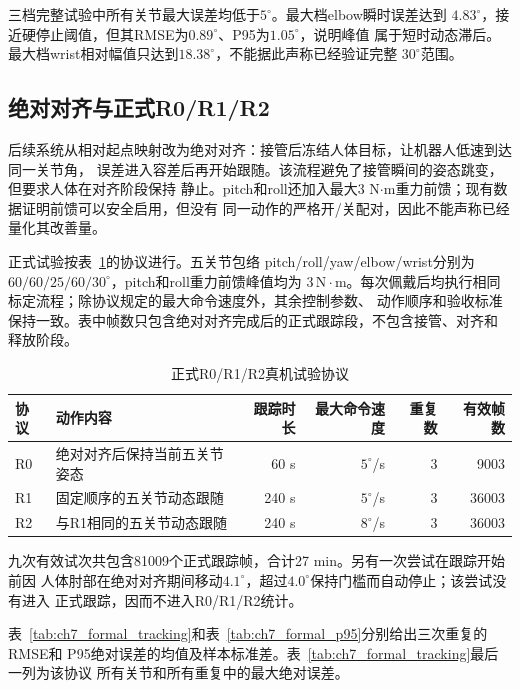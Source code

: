 三档完整试验中所有关节最大误差均低于$5^\circ$。最大档elbow瞬时误差达到
$4.83^\circ$，接近硬停止阈值，但其RMSE为$0.89^\circ$、P95为$1.05^\circ$，说明峰值
属于短时动态滞后。最大档wrist相对幅值只达到$18.38^\circ$，不能据此声称已经验证完整
$30^\circ$范围。

\subsection{绝对对齐与正式R0/R1/R2}
\label{subsec:ch7_absolute_formal_trials}

后续系统从相对起点映射改为绝对对齐：接管后冻结人体目标，让机器人低速到达同一关节角，
误差进入容差后再开始跟随。该流程避免了接管瞬间的姿态跳变，但要求人体在对齐阶段保持
静止。pitch和roll还加入最大3 N$\cdot$m重力前馈；现有数据证明前馈可以安全启用，但没有
同一动作的严格开/关配对，因此不能声称已经量化其改善量。

正式试验按表~\ref{tab:ch7_formal_protocols}的协议进行。五关节包络
pitch/roll/yaw/elbow/wrist分别为$60/60/25/60/30^\circ$，pitch和roll重力前馈峰值均为
$3\,\mathrm{N\!\cdot\!m}$。每次佩戴后均执行相同标定流程；除协议规定的最大命令速度外，其余控制参数、
动作顺序和验收标准保持一致。表中帧数只包含绝对对齐完成后的正式跟踪段，不包含接管、对齐和
释放阶段。

\begin{table}[htbp]
  \centering
  \caption{正式R0/R1/R2真机试验协议}
  \label{tab:ch7_formal_protocols}
  \begin{tabularx}{\linewidth}{@{}lXrrrr@{}}
    \toprule
    协议 & 动作内容 & 跟踪时长 & 最大命令速度 & 重复数 & 有效帧数 \\
    \midrule
    R0 & 绝对对齐后保持当前五关节姿态 & 60 s & $5^\circ$/s & 3 & 9003 \\
    R1 & 固定顺序的五关节动态跟随 & 240 s & $5^\circ$/s & 3 & 36003 \\
    R2 & 与R1相同的五关节动态跟随 & 240 s & $8^\circ$/s & 3 & 36003 \\
    \bottomrule
  \end{tabularx}
\end{table}

九次有效试次共包含81009个正式跟踪帧，合计27 min。另有一次尝试在跟踪开始前因
人体肘部在绝对对齐期间移动$4.1^\circ$，超过$4.0^\circ$保持门槛而自动停止；该尝试没有进入
正式跟踪，因而不进入R0/R1/R2统计。

表~\ref{tab:ch7_formal_tracking}和表~\ref{tab:ch7_formal_p95}分别给出三次重复的RMSE和
P95绝对误差的均值及样本标准差。表~\ref{tab:ch7_formal_tracking}最后一列为该协议
所有关节和所有重复中的最大绝对误差。


